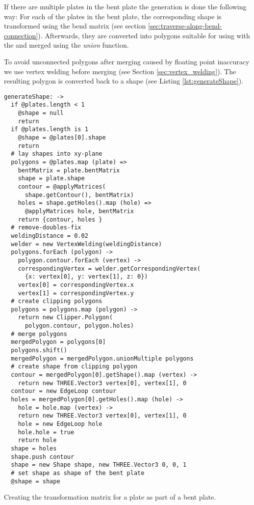 \documentclass[../ClassicThesis.tex]{subfiles}
\begin{document}
If there are multiple plates in the bent plate the generation is done the following way: For each of the plates in the bent plate, the corresponding shape is transformed using the bend matrix (see section \ref{sec:traverse-along-bend-connection}). Afterwards, they are converted into polygons suitable for using with the \jsclipper{} and merged using the \emph{union} function.

To avoid unconnected polygons after merging caused by floating point inaccuracy we use vertex welding before merging (see Section \ref{sec:vertex_welding}). The resulting polygon is converted back to a shape (see Listing \ref{lst:generateShape}).

\begin{listing}[ht]
\begin{verbatim}
generateShape: ->
  if @plates.length < 1
    @shape = null
    return
  if @plates.length is 1
    @shape = @plates[0].shape
    return
  # lay shapes into xy-plane
  polygons = @plates.map (plate) =>
    bentMatrix = plate.bentMatrix
    shape = plate.shape
    contour = @applyMatrices(
      shape.getContour(), bentMatrix)
    holes = shape.getHoles().map (hole) =>
      @applyMatrices hole, bentMatrix
    return {contour, holes }
  # remove-doubles-fix
  weldingDistance = 0.02
  welder = new VertexWelding(weldingDistance)
  polygons.forEach (polygon) ->
    polygon.contour.forEach (vertex) ->
    correspondingVertex = welder.getCorrespondingVertex(
      {x: vertex[0], y: vertex[1], z: 0})
    vertex[0] = correspondingVertex.x
    vertex[1] = correspondingVertex.y
  # create clipping polygons
  polygons = polygons.map (polygon) ->
    return new Clipper.Polygon(
      polygon.contour, polygon.holes)
  # merge polygons
  mergedPolygon = polygons[0]
  polygons.shift()
  mergedPolygon = mergedPolygon.unionMultiple polygons
  # create shape from clipping polygon
  contour = mergedPolygon[0].getShape().map (vertex) ->
    return new THREE.Vector3 vertex[0], vertex[1], 0
  contour = new EdgeLoop contour
  holes = mergedPolygon[0].getHoles().map (hole) ->
    hole = hole.map (vertex) ->
    return new THREE.Vector3 vertex[0], vertex[1], 0
    hole = new EdgeLoop hole
    hole.hole = true
    return hole
  shape = holes
  shape.push contour
  shape = new Shape shape, new THREE.Vector3 0, 0, 1
  # set shape as shape of the bent plate
  @shape = shape
\end{verbatim}
\caption{Creating the transformation matrix for a plate as part of a bent plate.}
\label{lst:generateShape}
\end{listing}
\end{document}

